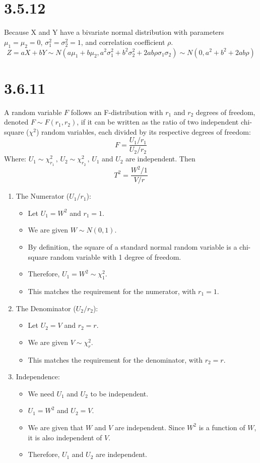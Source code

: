 \documentclass{article}
\begin{document}
\section*{3.5.12}
Because X and Y have a bivariate normal distribution with parameters $\mu_1 =\mu_2 =0$, 
$\sigma_1^2 = \sigma_2^2 = 1$,
and correlation coefficient $\rho$. 
\[
Z = aX+bY \sim N(a\mu_1+b\mu_2,a^2\sigma_1^2+b^2\sigma_2^2+2ab\rho\sigma_1\sigma_2)
\sim N(0,a^2+b^2+2ab\rho)
\]
\section*{3.6.11}
A random variable $F$ follows an F-distribution with $r_1$ and $r_2$ degrees of freedom, 
denoted $F \sim F(r_1, r_2)$, if it can be written as the ratio of two independent chi-square 
($\chi^2$) random variables, each divided by its respective degrees of freedom:
\[
F = \frac{U_1 / r_1}{U_2 / r_2}
\]
Where: $U_1 \sim \chi^2_{r_1}\, , \,  U_2 \sim \chi^2_{r_2}\, , \, U_1$ and $U_2$ are independent.
Then
\[
T^2 = \frac{W^2 / 1}{V / r}
\]
\begin{enumerate}
    \item The Numerator ($U_1 / r_1$):
    \begin{itemize}
        \item Let $U_1 = W^2$ and $r_1 = 1$.
        \item We are given $W \sim N(0, 1)$.
        \item By definition, the square of a standard normal random variable is a chi-square 
        random variable with 1 degree of freedom.
        \item Therefore, $U_1 = W^2 \sim \chi^2_1$.
        \item This matches the requirement for the numerator, with $r_1 = 1$.
    \end{itemize}
    \item The Denominator ($U_2 / r_2$):
    \begin{itemize}
        \item Let $U_2 = V$ and $r_2 = r$.
        \item We are given $V \sim \chi^2_r$.
        \item This matches the requirement for the denominator, with $r_2 = r$.
    \end{itemize}
    \item Independence:
    \begin{itemize}
        \item We need $U_1$ and $U_2$ to be independent.
        \item $U_1 = W^2$ and $U_2 = V$.
        \item We are given that $W$ and $V$ are independent. 
        Since $W^2$ is a function of $W$, it is also independent of $V$.
        \item Therefore, $U_1$ and $U_2$ are independent.
    \end{itemize}
\end{enumerate}
\end{document}
